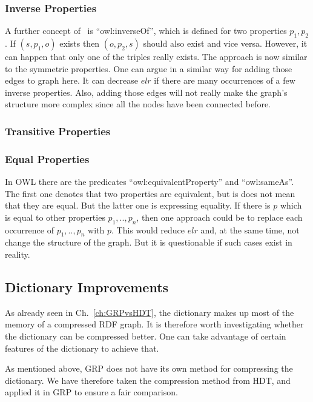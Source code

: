 \subsubsection{Inverse Properties}

A further concept of~\cite{owl} is  \enquote{owl:inverseOf}, which is defined for two properties $p_1, p_2$. If $(s,p_1,o)$ exists then $(o,p_2,s)$ should also exist and vice versa. However, it can happen that only one of the triples really exists. The approach is now similar to the symmetric properties. One can argue in a similar way for adding those edges to graph here. It can decrease $elr$ if there are many occurrences of a few inverse properties. Also, adding those edges will not really make the graph's structure more complex since all the nodes have been connected before.


\subsubsection{Transitive Properties}


\subsubsection{Equal Properties}

In OWL there are the predicates \enquote{owl:equivalentProperty} and \enquote{owl:sameAs}. The first one denotes that two properties are equivalent, but is does not mean that they are equal. But the latter one is expressing equality. If there is $p$ which is equal to other properties $p_1,..,p_n$, then one approach could be to replace each occurrence of $p_1,..,p_n$ with $p$. This would reduce $elr$ and, at the same time, not change the structure of the graph. But it is questionable if such cases exist in reality.




\subsection{Dictionary Improvements}\label{sec:approachDictImprovements}


As already seen in Ch.~\ref{ch:GRPvsHDT}, the dictionary makes up most of the memory of a compressed RDF graph. It is therefore worth investigating whether the dictionary can be compressed better. One can take advantage of certain features of the dictionary to achieve that.

As mentioned above, GRP does not have its own method for compressing the dictionary. We have therefore taken the compression method from HDT, and applied it in GRP to ensure a fair comparison.

